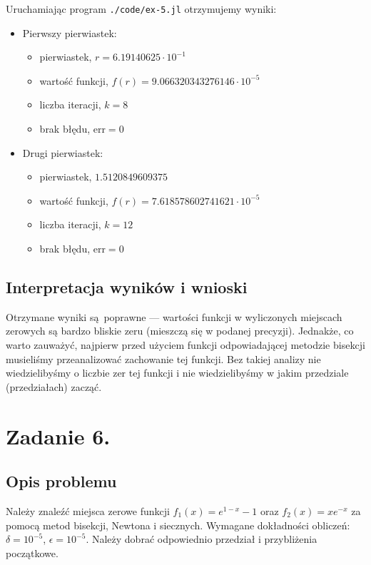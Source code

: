 \documentclass[10pt]{article}
\begin{document}
Uruchamiając program \texttt{./code/ex-5.jl} otrzymujemy wyniki:

\begin{itemize}
    \item Pierwszy pierwiastek:
    \begin{itemize}
        \item pierwiastek, $r = 6.19140625 \cdot 10^{-1}$
        \item wartość funkcji, $f(r) = 9.066320343276146 \cdot 10^{-5}$
        \item liczba iteracji, $k = 8$
        \item brak błędu, $\mathrm{err} = 0$
    \end{itemize}
    \item Drugi pierwiastek:
    \begin{itemize}
        \item pierwiastek, $1.5120849609375$
        \item wartość funkcji, $f(r) = 7.618578602741621 \cdot 10^{-5}$
        \item liczba iteracji, $k = 12$
        \item brak błędu, $\mathrm{err} = 0$
    \end{itemize}
\end{itemize}

\subsection{Interpretacja wyników i wnioski}

Otrzymane wyniki są poprawne — wartości funkcji w wyliczonych miejscach zerowych są bardzo bliskie zeru (mieszczą się w podanej precyzji). Jednakże, co warto zauważyć, najpierw przed użyciem funkcji odpowiadającej metodzie bisekcji musieliśmy przeanalizować zachowanie tej funkcji. Bez takiej analizy nie wiedzielibyśmy o liczbie zer tej funkcji i nie wiedzielibyśmy w jakim przedziale (przedziałach) zacząć.


\section{Zadanie 6.}

\subsection{Opis problemu}

Należy znaleźć miejsca zerowe funkcji $f_1(x) = e^{1-x} - 1$ oraz $f_2(x) = xe^{-x}$ za pomocą metod bisekcji, Newtona i siecznych. Wymagane dokładności obliczeń: $\delta = 10^{-5}$, $\epsilon = 10^{-5}$. Należy dobrać odpowiednio przedział i przybliżenia początkowe.
\end{document}
